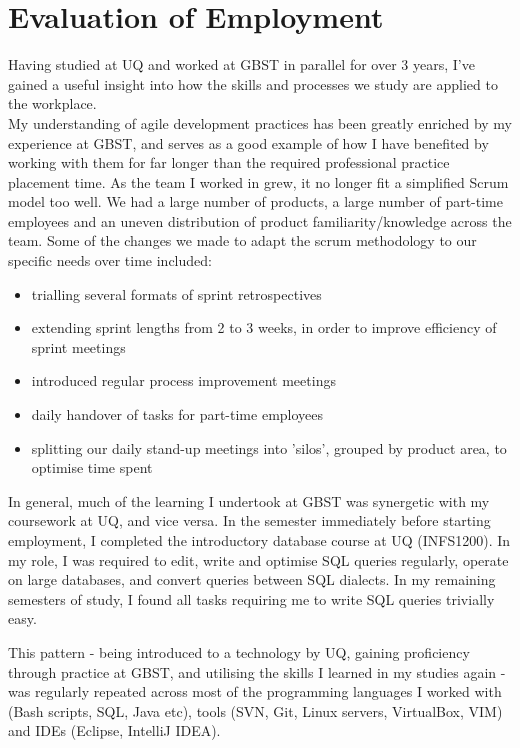 \chapter{Evaluation of Employment}

Having studied at UQ and worked at GBST in parallel for over 3 years, I've gained a useful insight into how the skills and processes we study are applied to the workplace. 
\\

My understanding of agile development practices has been greatly enriched by my experience at GBST, and serves as a good example of how I have benefited by working with them for far longer than the required professional practice placement time. As the team I worked in grew, it no longer fit a simplified Scrum model too well. We had a large number of products, a large number of part-time employees and an uneven distribution of product familiarity/knowledge across the team. Some of the changes we made to adapt the scrum methodology to our specific needs over time included:
\begin{itemize}
\item trialling several formats of sprint retrospectives
\item extending sprint lengths from 2 to 3 weeks, in order to improve efficiency of sprint meetings
\item introduced regular process improvement meetings
\item daily handover of tasks for part-time employees
\item splitting our daily stand-up meetings into 'silos', grouped by product area, to optimise time spent
\end{itemize}

In general, much of the learning I undertook at GBST was synergetic with my coursework at UQ, and vice versa. In the semester immediately before starting employment, I completed the introductory database course at UQ (INFS1200). In my role, I was required to edit, write and optimise SQL queries regularly, operate on large databases, and convert queries between SQL dialects. In my remaining semesters of study, I found all tasks requiring me to write SQL queries trivially easy.

This pattern - being introduced to a technology by UQ, gaining proficiency through practice at GBST, and utilising the skills I learned in my studies again - was regularly repeated across most of the programming languages I worked with (Bash scripts, SQL, Java etc), tools (SVN, Git, Linux servers, VirtualBox, VIM) and IDEs (Eclipse, IntelliJ IDEA).

